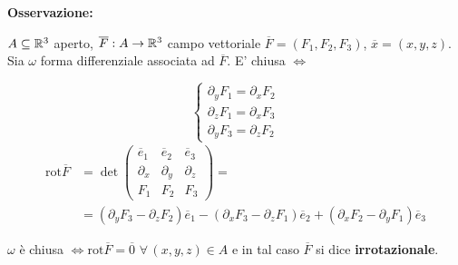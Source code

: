 \textbf{Osservazione:}

$A \subseteq \mathbb{R}^3$ aperto, $\overline{F}: A \rightarrow \mathbb{R}^3$ campo vettoriale $\overline{F}= (F_1,F_2,F_3)$, $\overline{x}=(x,y,z)$. Sia $\omega$ forma differenziale associata ad $\overline{F}$. E' chiusa $\Leftrightarrow$

$$\begin{cases}
	\partial_yF_1=\partial_xF_2\\
	\partial_zF_1=\partial_x F_3\\
	\partial_yF_3= \partial_z F_2
\end{cases}$$
\begin{align*} 
	\text{rot}\overline{F}
	&=\det \begin{pmatrix}
		\overline{e}_1 & \overline{e}_2 & \overline{e}_3\\
		\partial_x &\partial_y &\partial_z\\
		F_1 &F_2 &F_3
	\end{pmatrix}=
	\\
	&=(\partial_yF_3-\partial_zF_2)\overline{e}_1-(\partial_xF_3-\partial_zF_1)\overline{e}_2+(\partial_xF_2-\partial_yF_1)\overline{e}_3
\end{align*}

\begin{attbar}
	$\omega $ è chiusa $\Leftrightarrow \text{rot}\overline{F}=\overline{0}\,\, \forall \, (x,y,z)\in A$ e in tal caso $\overline{F}$ si dice \textbf{irrotazionale}.
\end{attbar}


